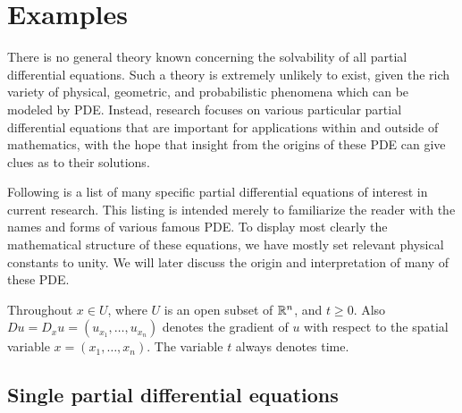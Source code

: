 \section{Examples}
\label{sec:1-2}

There is no general theory known concerning the solvability of all partial
differential equations. Such a theory is extremely unlikely to exist, given the
rich variety of physical, geometric, and probabilistic phenomena which can be
modeled by PDE. Instead, research focuses on various particular partial
differential equations that are important for applications within and outside
of mathematics, with the hope that insight from the origins of these PDE can
give clues as to their solutions.

Following is a list of many specific partial differential equations of interest
in current research. This listing is intended merely to familiarize the reader
with the names and forms of various famous PDE. To display most clearly the
mathematical structure of these equations, we have mostly set relevant physical
constants to unity. We will later discuss the origin and interpretation of many
of these PDE.

Throughout $x\in U$, where $U$ is an open subset of $\mathbb{R}^n$, and $t\geq0$.
Also $Du=D_xu=(u_{x_1},\ldots,u_{x_n})$ denotes the gradient of $u$ with
respect to the spatial variable $x=(x_1,\ldots,x_n)$. The variable $t$ always
denotes time.

\subsection{Single partial differential equations}
